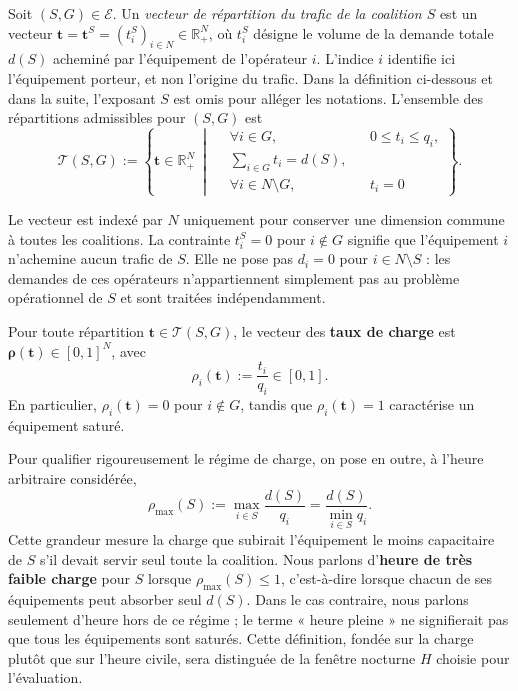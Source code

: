 \begin{definition}
Soit $(S,G)\in\mathcal E$. Un \textit{vecteur de répartition du trafic de
la coalition \(S\)} est un vecteur
$\mathbf t=\mathbf t^S=(t_i^S)_{i\in N}\in\mathbb R_+^N$, où
$t_i^S$ désigne le volume de la demande totale \(d(S)\) acheminé par
l'équipement de l'opérateur $i$. L'indice \(i\) identifie ici
l'équipement porteur, et non l'origine du trafic. Dans la définition
ci-dessous et dans la suite, l'exposant \(S\) est omis pour alléger les
notations. L'ensemble des répartitions admissibles pour $(S,G)$ est
\[
\mathcal T(S,G):=
\left\{
\mathbf t\in\mathbb R_+^N\ \middle|\
\begin{aligned}
    &\forall i\in G, &&0\leqslant t_i\leqslant q_i,\\
    &\sum_{i\in G}t_i=d(S),\\
    &\forall i\in N\setminus G, &&t_i=0
\end{aligned}
\right\}.
\]
\end{definition}

Le vecteur est indexé par \(N\) uniquement pour conserver une dimension
commune à toutes les coalitions. La contrainte \(t_i^S=0\) pour \(i\notin G\)
signifie que l'équipement \(i\) n'achemine aucun trafic de \(S\). Elle ne
pose pas \(d_i=0\) pour \(i\in N\setminus S\) : les demandes de ces
opérateurs n'appartiennent simplement pas au problème opérationnel de \(S\)
et sont traitées indépendamment.

Pour toute répartition \(\mathbf t\in\mathcal T(S,G)\), le vecteur des
\textbf{taux de charge} est \(\boldsymbol\rho(\mathbf t)\in[0,1]^N\), avec
\[
    \rho_i(\mathbf t):=\frac{t_i}{q_i}\in[0,1].
\]
En particulier, \(\rho_i(\mathbf t)=0\) pour \(i\notin G\), tandis que
\(\rho_i(\mathbf t)=1\) caractérise un équipement saturé.

Pour qualifier rigoureusement le régime de charge, on pose en outre, à
l'heure arbitraire considérée,
\[
    \rho_{\max}(S)
    :=\max_{i\in S}\frac{d(S)}{q_i}
    =\frac{d(S)}{\min_{i\in S}q_i}.
\]
Cette grandeur mesure la charge que subirait l'équipement le moins
capacitaire de \(S\) s'il devait servir seul toute la coalition. Nous parlons
d'\textbf{heure de très faible charge} pour \(S\) lorsque
\(\rho_{\max}(S)\leqslant1\), c'est-à-dire lorsque chacun de ses
équipements peut absorber seul \(d(S)\). Dans le cas contraire, nous
parlons seulement d'heure hors de ce régime ; le terme « heure pleine » ne
signifierait pas que tous les équipements sont saturés. Cette définition,
fondée sur la charge plutôt que sur l'heure civile, sera distinguée de la
fenêtre nocturne \(H\) choisie pour l'évaluation.



